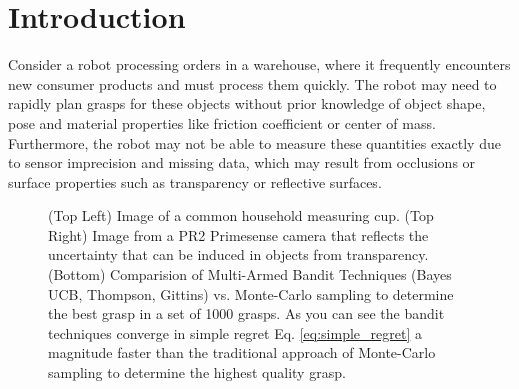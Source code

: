\documentclass[journal,transmag]{IEEEtran}%
\begin{document}
\section{Introduction}



Consider a robot processing orders in a warehouse, where it frequently encounters new consumer products and must process them quickly.
The robot may need to rapidly plan grasps for these objects without prior knowledge of object shape, pose and material properties like friction coefficient or center of mass. 
Furthermore, the robot may not be able to measure these quantities exactly due to sensor imprecision and missing data, which may result from occlusions or surface properties such as transparency or reflective surfaces.

\begin{figure}%
    \centering
    
  
   
    \caption{(Top Left) Image of a common household measuring cup. (Top Right) Image from a PR2 Primesense camera that reflects the uncertainty that can be induced in objects from transparency. (Bottom) Comparision of Multi-Armed Bandit Techniques (Bayes UCB, Thompson, Gittins) vs. Monte-Carlo sampling to determine the best grasp in a set of 1000 grasps. As you can see the bandit techniques converge in simple regret Eq. \ref{eq:simple_regret} a magnitude faster than the traditional approach of Monte-Carlo sampling to determine the highest quality grasp.  }%
    \label{fig:rot_shapes}%
\end{figure}
\end{document}
